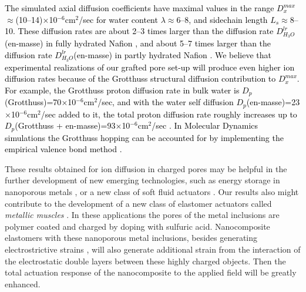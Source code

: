 \documentclass[3p,english,preprint]{elsarticle}
\newcommand{\need}[1]{\textcolor{black}{#1}}
\newcommand{\mage}[1]{\textcolor{black}{#1}}
\begin{document}
 
{\need{ 
The simulated  axial diffusion coefficients have maximal values 
in the range $D_x^{max}$$\approx$(10--14)$\times$10$^{-6}$cm$^2$/sec for  
 water content $\lambda$$\approx$6--8, and 
sidechain length $L_s$$\approx$8--10. These diffusion rates  are 
about  2--3 times larger  than the diffusion rate  $D_{H_3O}^{lr}$(en-masse) in fully hydrated 
Nafion \cite{li-2001-partial-charges,sun-2015-md-simulation-diffusion}, 
and about 5--7 times larger than the diffusion rate  $D_{H_3O}^{lr}$(en-masse) in partly hydrated Nafion 
\cite{perrin-2007,allahyarov-2011-diff-archit,cui-2008}. 
We believe that experimental realizations of our grafted pore set-up will produce even higher ion diffusion rates because of the 
 Grotthuss structural diffusion contribution to $D_x^{max}$.
For example, the Grotthuss proton diffusion rate in bulk water is 
$D_p$(Grotthuss)=70$\times$10$^{-6}$cm$^2$/sec, and with the water 
self diffusion $D_p$(en-masse)=23$\times$10$^{-6}$cm$^2$/sec added to it,  
the total proton diffusion rate roughly increases up to   
$D_p$(Grotthuss + en-masse)=93$\times$10$^{-6}$cm$^2$/sec  \cite{choi2005,agmon-1995-water-grotthuss}. 
In Molecular Dynamics simulations the Grotthuss hopping can be accounted for by implementing  the  empirical valence bond method
\cite{eikerling-kornyshev-2001,paul-paddison-2005-pore,walbran-2001}.
}}





These results obtained for ion diffusion in charged pores 
may be helpful in the  further 
development of  new emerging technologies, such as  energy storage in 
nanoporous metals \cite{zhang-2012-nanoporous-metals}, or  
a new class of soft fluid actuators \cite{sritharan-2016-liquid-actuators}. 
Our results also might contribute to the development of a new class of elastomer 
actuators called {\it metallic muscles}  \cite{detsi-2013-charged-pore-actuator}.
In these applications the pores of the metal inclusions  are polymer coated
 and charged by doping with sulfuric acid. Nanocomposite elastomers with these nanoporous metal 
inclusions,   besides generating electrostrictive strains 
\cite{allahyarov-actuator-2015-multilayer,allahyarov-electroactuator-2015-inclusions,allahyarov-actuation-2016}, will also generate additional strain from the 
interaction of the electrostatic double layers between these highly charged objects. 
Then the total actuation response of the nanocomposite to the applied field will be 
greatly enhanced. 
\end{document}
